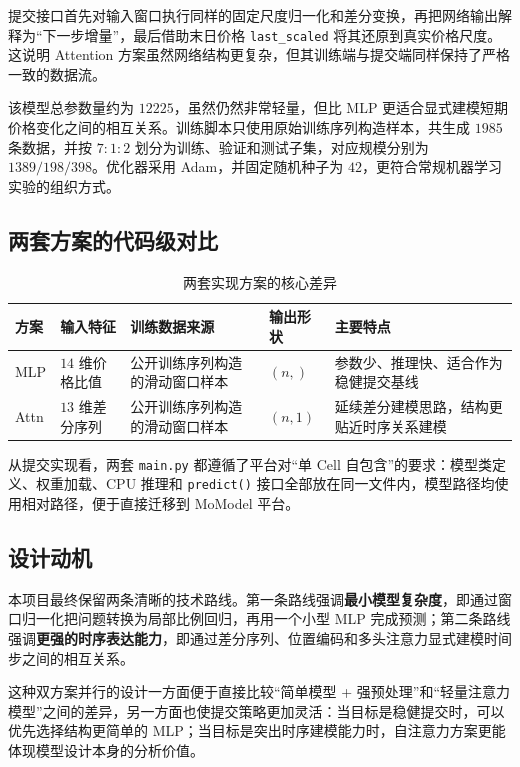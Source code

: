 提交接口首先对输入窗口执行同样的固定尺度归一化和差分变换，再把网络输出解释为“下一步增量”，最后借助末日价格 \texttt{last\_scaled} 将其还原到真实价格尺度。这说明 Attention 方案虽然网络结构更复杂，但其训练端与提交端同样保持了严格一致的数据流。

该模型总参数量约为 $12225$，虽然仍然非常轻量，但比 MLP 更适合显式建模短期价格变化之间的相互关系。训练脚本只使用原始训练序列构造样本，共生成 $1985$ 条数据，并按 $7:1:2$ 划分为训练、验证和测试子集，对应规模分别为 $1389/198/398$。优化器采用 Adam，并固定随机种子为 $42$，更符合常规机器学习实验的组织方式。

\subsection{两套方案的代码级对比}

\begin{table}[H]
    \centering
    \caption{两套实现方案的核心差异}
    \begin{tabular}{p{2.0cm}p{3.2cm}p{3.0cm}p{2.2cm}p{3.4cm}}
        \toprule
        方案 & 输入特征 & 训练数据来源 & 输出形状 & 主要特点 \\
        \midrule
        MLP & $14$ 维价格比值 & 公开训练序列构造的滑动窗口样本 & $(n,)$ & 参数少、推理快、适合作为稳健提交基线 \\
        Attn & $13$ 维差分序列 & 公开训练序列构造的滑动窗口样本 & $(n,1)$ & 延续差分建模思路，结构更贴近时序关系建模 \\
        \bottomrule
    \end{tabular}
\end{table}

从提交实现看，两套 \texttt{main.py} 都遵循了平台对“单 Cell 自包含”的要求：模型类定义、权重加载、CPU 推理和 \texttt{predict()} 接口全部放在同一文件内，模型路径均使用相对路径，便于直接迁移到 MoModel 平台。

\subsection{设计动机}

本项目最终保留两条清晰的技术路线。第一条路线强调\textbf{最小模型复杂度}，即通过窗口归一化把问题转换为局部比例回归，再用一个小型 MLP 完成预测；第二条路线强调\textbf{更强的时序表达能力}，即通过差分序列、位置编码和多头注意力显式建模时间步之间的相互关系。

这种双方案并行的设计一方面便于直接比较“简单模型 + 强预处理”和“轻量注意力模型”之间的差异，另一方面也使提交策略更加灵活：当目标是稳健提交时，可以优先选择结构更简单的 MLP；当目标是突出时序建模能力时，自注意力方案更能体现模型设计本身的分析价值。

